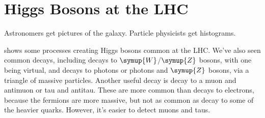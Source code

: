 \documentclass[fleqn]{NotesClass}
\newcommand{\Pparticle}[1]{\symup{#1}}
\newcommand{\PZ}{\ensuremath{\Pparticle{Z}}}
\newcommand{\PW}{\ensuremath{\Pparticle{W}}}
\begin{document}
    \section{Higgs Bosons at the LHC}
    \epigraph{Astronomers get pictures of the galaxy. Particle physicists get histograms.}{}
     shows some processes creating Higgs bosons common at the LHC.
    We've also seen common decays, including decays to \PW{}/\PZ{} bosons, with one being virtual, and decays to photons or photons and \PZ{} bosons, via a triangle of massive particles.
    Another useful decay is decay to a muon and antimuon or tau and antitau.
    These are more common than decays to electrons, because the fermions are more massive, but not as common as decay to some of the heavier quarks.
    However, it's easier to detect muons and taus.
    
\end{document}
